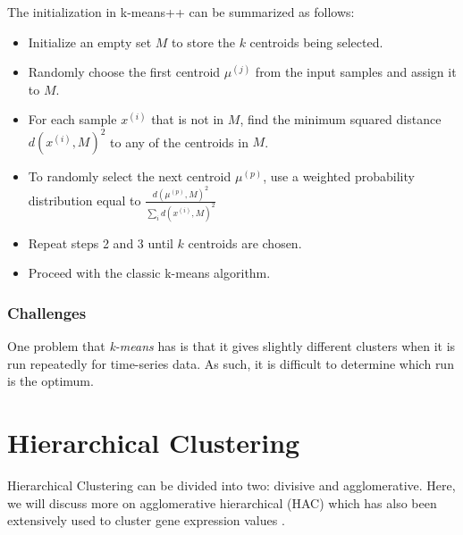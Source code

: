 The initialization in k-means++ can be summarized as follows:
\begin{itemize}
	\item Initialize an empty set $M$ to store the $k$ centroids being selected.
	\item Randomly choose the first centroid $\mu^{(j)}$ from the input samples and assign it to $M$.
	\item For each sample $x^{(i)}$ that is not in $M$, find the minimum squared distance $d(x^{(i)}, M)^2$ to any of the centroids in $M$.
	\item To randomly select the next centroid $\mu^{(p)}$, use a weighted probability distribution equal to $\frac{d(\mu^{(p)},M)^2}{\sum_i d(x^{(i)},M)^2}$
	\item Repeat steps 2 and 3 until $k$ centroids are chosen.
	\item Proceed with the classic k-means algorithm.
\end{itemize}

\subsubsection{Challenges}
One problem that \textit{k-means} has is that it gives slightly different clusters when it is run repeatedly for time-series data. As such, it is difficult to determine which run is the optimum.

\section{Hierarchical Clustering} \label{4.4}
Hierarchical Clustering can be divided into two: divisive and agglomerative. Here, we will discuss more on agglomerative hierarchical (HAC) which has also been extensively used to cluster gene expression values \cite{Eisen14863}. 

